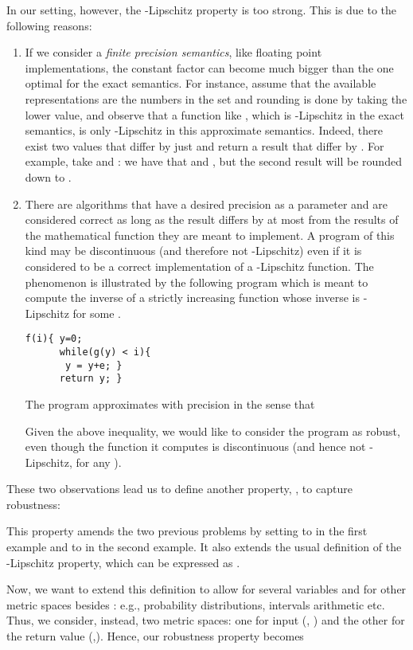 \documentclass[copyright,creativecommons]{eptcs}
\begin{document}
In our setting, however, the -Lipschitz property is too
strong. This is due to the following  reasons:
\begin{enumerate}
\item If we consider a \emph{finite precision semantics}, like
  floating point implementations, the constant factor  can become
  much bigger than the one optimal for the exact semantics. For
  instance, assume that the available representations are the numbers
  in the set  and rounding is done
  by taking the lower value, and observe that a function like , which is -Lipschitz in the exact semantics,
  is only -Lipschitz in this approximate semantics. Indeed, there
  exist two values that differ by just  and return a result
  that differ by . For example, take  and  :
  we have that  and , but
  the   second result will be rounded down to .


\item There are algorithms that have a desired precision  as a
  parameter and are considered correct as long as the result differs
  by at most  from the results of the mathematical function they
  are meant to implement.  A program of this kind may be discontinuous
  (and therefore not -Lipschitz) even if it is considered to be a
  correct implementation of a -Lipschitz function.  The phenomenon
  is illustrated by the following program  which is meant to
  compute the inverse of a strictly increasing function
   whose inverse is -Lipschitz for some
  .
{\begin{lstlisting}[language=pscode]
f(i){ y=0;
      while(g(y) < i){
	   y = y+e; }
      return y; }
\end{lstlisting}}   
 
The program  approximates   with precision   in the sense that 

Given the above inequality, we would like to consider the  program 
as robust, even though the function it computes is discontinuous (and
hence not -Lipschitz, for any ). 

\end{enumerate}

These two observations lead us to define another property,
, to capture robustness:  

This property amends the two previous problems by setting  to
 in the first example and to  in the second example.
It also extends the usual definition of the -Lipschitz property, which can be expressed as . 

Now, we want to extend this definition to allow for several variables
and for other metric spaces besides : e.g., probability
distributions, intervals arithmetic etc.  Thus, we consider, instead,
two metric spaces: one for input (, ) and the other for the
return value (,).  Hence, our robustness property
 becomes
\end{document}
